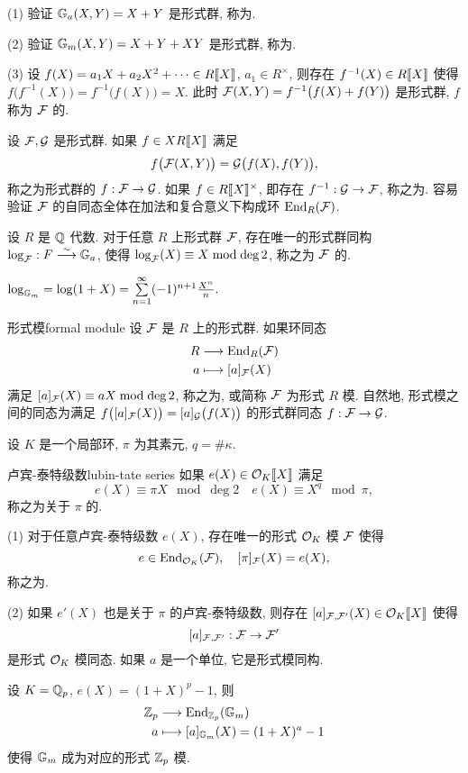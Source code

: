 \begin{exercise}
(1) 验证 $\mathbb{G}_a(X,Y)=X+Y$ 是形式群, 称为.

(2) 验证 $\mathbb{G}_m(X,Y)=X+Y+XY$ 是形式群, 称为.

(3) 设 $f(X)=a_1 X+a_2X^2+\dots\in R\llbracket X\rrbracket$, $a_1\in R^\times$, 则存在 $f^{-1}(X)\in R\llbracket X\rrbracket$ 使得 $f\bigl(f^{-1}(X)\bigr)=f^{-1}\bigl(f(X)\bigr)=X$. 此时 ${\mathcal{F}}(X,Y)=f^{-1}\bigl(f(X)+f(Y)\bigr)$ 是形式群, $f$ 称为 ${\mathcal{F}}$ 的.
\end{exercise}


设 ${\mathcal{F}},{\mathcal{G}}$ 是形式群. 如果 $f\in XR\llbracket X\rrbracket$ 满足
  \[f\bigl({\mathcal{F}}(X,Y)\bigr)={\mathcal{G}}\bigl(f(X),f(Y)\bigr),\]
称之为形式群的 $f:{\mathcal{F}}\to {\mathcal{G}}$. 如果 $f\in R\llbracket X\rrbracket^\times$, 即存在 $f^{-1}:{\mathcal{G}}\to {\mathcal{F}}$, 称之为. 容易验证 ${\mathcal{F}}$ 的自同态全体在加法和复合意义下构成环 ${\mathrm{End}}_R({\mathcal{F}})$.

\begin{exercise}
设 $R$ 是 ${\mathbb{Q}}$ 代数. 对于任意 $R$ 上形式群 ${\mathcal{F}}$, 存在唯一的形式群同构 $\log_{\mathcal{F}}:F\stackrel{\sim}{\longrightarrow} \mathbb{G}_a$, 使得 $\log_{\mathcal{F}}(X)\equiv X\bmod\deg 2$, 称之为 ${\mathcal{F}}$ 的.
\end{exercise}

\begin{exercise}
$\log_{\mathbb{G}_m}=\log(1+X)=\sum\limits_{n=1}^\infty(-1)^{n+1}\frac{X^n}{n}.$
\end{exercise}

\begin{definition}{形式模}{formal module}
设 ${\mathcal{F}}$ 是 $R$ 上的形式群. 如果环同态
  \[\begin{split}R &\longrightarrow {\mathrm{End}}_R({\mathcal{F}}) \\ a &\longmapsto [a]_{\mathcal{F}}(X)\end{split}\]
满足 $[a]_{\mathcal{F}}(X)\equiv aX\bmod \deg 2$, 称之为, 或简称 ${\mathcal{F}}$ 为形式 $R$ 模. 自然地, 形式模之间的同态为满足 $f\bigl([a]_{\mathcal{F}}(X)\bigr)=[a]_{\mathcal{G}}\bigl(f(X)\bigr)$ 的形式群同态 $f:{\mathcal{F}}\to {\mathcal{G}}$.
\end{definition}

设 $K$ 是一个局部环, $\pi$ 为其素元, $q=\#\kappa$. 

\begin{definition}{卢宾-泰特级数}{lubin-tate series}
如果 $e(X)\in {\mathcal{O}}_K\llbracket X\rrbracket$ 满足
  \[e(X)\equiv \pi X\mod \deg 2\quad e(X)\equiv X^q\mod\pi,\]
称之为关于 $\pi$ 的.
\end{definition}

\begin{theorem}{}{}
(1) 对于任意卢宾-泰特级数 $e(X)$, 存在唯一的形式 ${\mathcal{O}}_K$ 模 ${\mathcal{F}}$ 使得 
  \[e\in{\mathrm{End}}_{{\mathcal{O}}_K}({\mathcal{F}}),\quad [\pi]_{\mathcal{F}}(X)=e(X),\]
称之为.

(2) 如果 $e'(X)$ 也是关于 $\pi$ 的卢宾-泰特级数, 则存在 $[a]_{{\mathcal{F}},{\mathcal{F}}'}(X)\in{\mathcal{O}}_K\llbracket X\rrbracket$ 使得
  \[[a]_{{\mathcal{F}},{\mathcal{F}}'}:{\mathcal{F}}\to{\mathcal{F}}'\]
是形式 ${\mathcal{O}}_K$ 模同态. 如果 $a$ 是一个单位, 它是形式模同构.
\end{theorem}
\begin{example}
设 $K={\mathbb{Q}}_p$, $e(X)=(1+X)^p-1$, 则
  \[\begin{split}{\mathbb{Z}}_p &\longrightarrow {\mathrm{End}}_{{\mathbb{Z}}_p}(\mathbb{G}_m) \\ a &\longmapsto [a]_{\mathbb{G}_m}(X)=(1+X)^a-1\end{split}\]
使得 $\mathbb{G}_m$ 成为对应的形式 ${\mathbb{Z}}_p$ 模.
\end{example}

